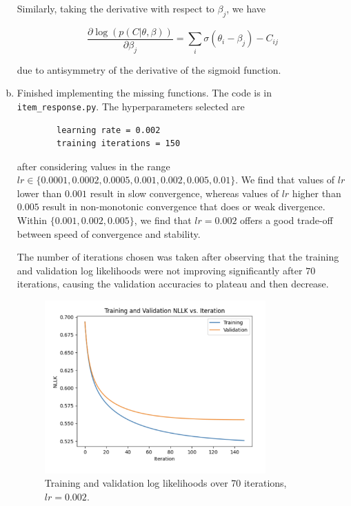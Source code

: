 \documentclass{article}
\begin{document}
\begin{enumerate}[(a)]
    Similarly, taking the derivative with respect to $\beta_j$, we have

    \[\frac{\partial  \log(p(C | \theta, \beta))}{\partial \beta_j} = \sum_i \sigma(\theta_i - \beta_j) - C_{ij}\]

    due to antisymmetry of the derivative of the sigmoid function.

    \item Finished implementing the missing functions. The code is in \texttt{item\_response.py}. The hyperparameters selected are 
    
    \begin{verbatim}
        learning rate = 0.002
        training iterations = 150
    \end{verbatim}

    after considering values in the range $lr \in \{0.0001, 0.0002, 0.0005, 0.001, 0.002, 0.005, 0.01\}$. We find that values of $lr$ lower than $0.001$ result in slow convergence, whereas values of $lr$ higher than $0.005$ result in non-monotonic convergence that does or weak divergence. Within $\{0.001, 0.002, 0.005\}$, we find that $lr = 0.002$ offers a good trade-off between speed of convergence and stability.

    The number of iterations chosen was taken after observing that the training and validation log likelihoods were not improving significantly after $70$ iterations, causing the validation accuracies to plateau and then decrease.

    \begin{figure}[H]
        \centering
        \includegraphics[width=0.8\textwidth]{q2b.png}
        \caption{Training and validation log likelihoods over 70 iterations, $lr =0.002$.}
        \label{fig:loss}
    \end{figure}


\end{enumerate}
\end{document}
